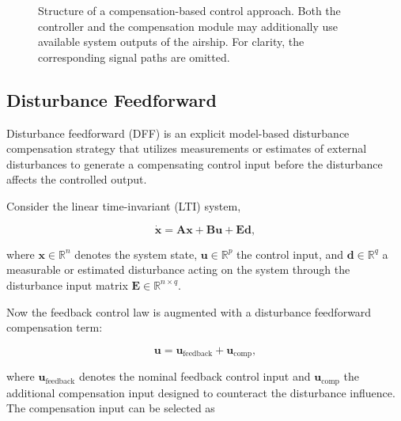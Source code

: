 \begin{figure}[htbp]
	
	\caption{Structure of a compensation-based control approach. Both the controller and the compensation module may additionally use available system outputs of the airship. For clarity, the corresponding signal paths are omitted.}
	\label{fig:compensation_principle}
	
\end{figure}





\subsection{Disturbance Feedforward}

Disturbance feedforward (DFF) is an explicit model-based disturbance compensation strategy that utilizes measurements or estimates of external disturbances to generate a compensating control input before the disturbance affects the controlled output.

Consider the linear time-invariant (LTI) system,

\begin{equation}
	\dot{\bm{x}}
	=
	\bm{A}\bm{x}
	+
	\bm{B}\bm{u}
	+
	\bm{E}\bm{d},
\end{equation}

where $\bm{x} \in \mathbb{R}^n$ denotes the system state, $\bm{u} \in \mathbb{R}^p$ the control input, and $\bm{d} \in \mathbb{R}^q$ a measurable or estimated disturbance acting on the system through the disturbance input matrix $\bm{E} \in \mathbb{R}^{n \times q}$.

Now the feedback control law is augmented with a disturbance feedforward compensation term:

\begin{equation}
	\bm{u}
	=
	\bm{u}_\mathrm{feedback} + \bm{u}_\mathrm{comp},
\end{equation}

where $\bm{u}_\mathrm{feedback}$ denotes the nominal feedback control input and 
$\bm{u}_\mathrm{comp}$ the additional compensation input designed to counteract the disturbance influence.
The compensation input can be selected as~\cite{Lunze2013Regelungstechnik2}

